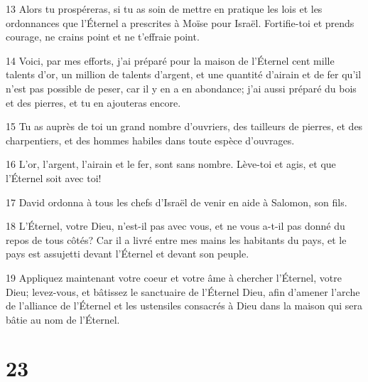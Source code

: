 \par 13 Alors tu prospéreras, si tu as soin de mettre en pratique les lois et les ordonnances que l'Éternel a prescrites à Moïse pour Israël. Fortifie-toi et prends courage, ne crains point et ne t'effraie point.
\par 14 Voici, par mes efforts, j'ai préparé pour la maison de l'Éternel cent mille talents d'or, un million de talents d'argent, et une quantité d'airain et de fer qu'il n'est pas possible de peser, car il y en a en abondance; j'ai aussi préparé du bois et des pierres, et tu en ajouteras encore.
\par 15 Tu as auprès de toi un grand nombre d'ouvriers, des tailleurs de pierres, et des charpentiers, et des hommes habiles dans toute espèce d'ouvrages.
\par 16 L'or, l'argent, l'airain et le fer, sont sans nombre. Lève-toi et agis, et que l'Éternel soit avec toi!
\par 17 David ordonna à tous les chefs d'Israël de venir en aide à Salomon, son fils.
\par 18 L'Éternel, votre Dieu, n'est-il pas avec vous, et ne vous a-t-il pas donné du repos de tous côtés? Car il a livré entre mes mains les habitants du pays, et le pays est assujetti devant l'Éternel et devant son peuple.
\par 19 Appliquez maintenant votre coeur et votre âme à chercher l'Éternel, votre Dieu; levez-vous, et bâtissez le sanctuaire de l'Éternel Dieu, afin d'amener l'arche de l'alliance de l'Éternel et les ustensiles consacrés à Dieu dans la maison qui sera bâtie au nom de l'Éternel.

\chapter{23}

